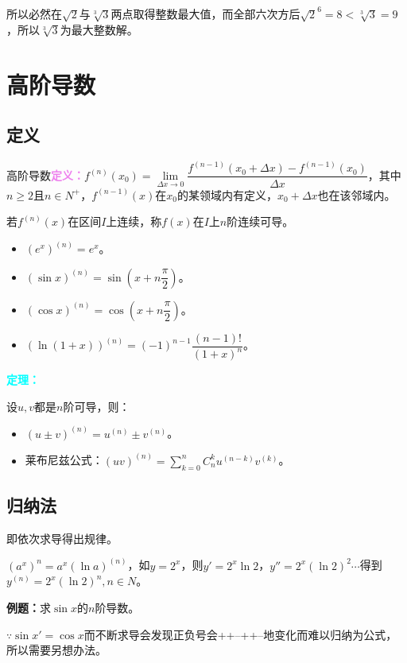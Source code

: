 \documentclass[UTF8, 12pt]{ctexart}
\begin{document}
所以必然在$\sqrt{2}$与$\sqrt[3]{3}$两点取得整数最大值，而全部六次方后$\sqrt{2}^6=8<\sqrt[3]{3}=9$，所以$\sqrt[3]{3}$为最大整数解。

\section{高阶导数}

\subsection{定义}

高阶导数\textcolor{violet}{\textbf{定义：}}$f^{(n)}(x_0)=\lim\limits_{\Delta x\to 0}\dfrac{f^{(n-1)}(x_0+\Delta x)-f^{(n-1)}(x_0)}{\Delta x}$，其中$n\geqslant 2$且$n\in N^+$，$f^{(n-1)}(x)$在$x_0$的某领域内有定义，$x_0+\Delta x$也在该邻域内。

若$f^{(n)}(x)$在区间$I$上连续，称$f(x)$在$I$上$n$阶连续可导。

\begin{itemize}
    \item $(e^x)^{(n)}=e^x$。
    \item $(\sin x)^{(n)}=\sin(x+n\dfrac{\pi}{2})$。
    \item $(\cos x)^{(n)}=\cos(x+n\dfrac{\pi}{2})$。
    \item $(\ln(1+x))^{(n)}=(-1)^{n-1}\dfrac{(n-1)!}{(1+x)^n}$。
\end{itemize}

\textcolor{aqua}{\textbf{定理：}}

设$u,v$都是$n$阶可导，则：

\begin{itemize}
    \item $(u\pm v)^{(n)}=u^{(n)}\pm v^{(n)}$。
    \item 莱布尼兹公式：$(uv)^{(n)}=\sum_{k=0}^nC_n^ku^{(n-k)}v^{(k)}$。
\end{itemize}

\subsection{归纳法}

即依次求导得出规律。

$(a^x)^n=a^x(\ln a)^{(n)}$，如$y=2^x$，则$y'=2^x\ln 2$，$y''=2^x(\ln 2)^2\cdots$得到$y^{(n)}=2^x(\ln 2)^n,n\in N$。

\textbf{例题：}求$\sin x$的$n$阶导数。

$\because \sin x'=\cos x$而不断求导会发现正负号会++--++--地变化而难以归纳为公式，所以需要另想办法。
\end{document}
